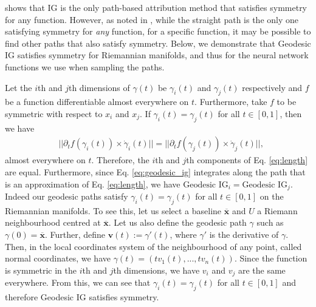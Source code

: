 \citep[Theorem 1]{sundararajan2017axiomatic} shows that IG is the only path-based attribution method that satisfies symmetry for any function. However, as noted in \cite{kapishnikov2021guided}, while the straight path is the only one satisfying symmetry for \emph{any} function, for a specific function, it may be possible to find other paths that also satisfy symmetry. Below, we demonstrate that Geodesic IG satisfies symmetry for Riemannian manifolds, and thus for the neural network functions we use when sampling the paths.

Let the $i$th and $j$th dimensions of $\gamma(t)$ be $\gamma_i(t)$ and $\gamma_j(t)$ respectively and $f$ be a function differentiable almost everywhere on $t$. Furthermore, take $f$ to be symmetric with respect to $x_i$ and $x_j$. If $\gamma_i(t) = \gamma_j(t)$ for all $t \in [0,1]$, then we have 
\begin{equation}
	\begin{split}
		& ||\partial_t f(\gamma_i(t)) \times \dot\gamma_i(t)|| = ||\partial_t f(\gamma_j(t)) \times \dot\gamma_j(t)||,
	\end{split}
	\label{eq:norms}
\end{equation}
almost everywhere on $t$. Therefore, the $i$th and $j$th components of Eq. \ref{eq:length} are equal. Furthermore, since  Eq. \ref{eq:geodesic_ig} integrates along the path that is an approximation of Eq. \ref{eq:length}, we have $\textrm{Geodesic IG}_i = \textrm{Geodesic IG}_j$. Indeed our geodesic paths satisfy  $\gamma_i(t) = \gamma_j(t)$ for all $t \in [0,1]$ on the Riemannian manifolds. To see this, let us select a baseline $\overline{\textbf{x}}$ and $U$ a Riemann neighbourhood centred at $\overline{\textbf{x}}$. Let us also define the geodesic path $\gamma$ such as $\gamma(0) = \overline{\textbf{x}}$. Further, define $\textbf{v}(t):=\gamma'(t)$, where $\gamma'$ is the derivative of $\gamma$. Then, in the local coordinates system of the neighbourhood of any point, called normal coordinates, we have $\gamma(t) = (tv_1(t), ..., tv_n(t))$. Since the function is symmetric in the $i$th and $j$th dimensions, we have $v_i$ and $v_j$ are the same everywhere. From this, we can see that $\gamma_i(t) = \gamma_j(t)$ for all $t \in [0,1]$ and therefore Geodesic IG satisfies symmetry.